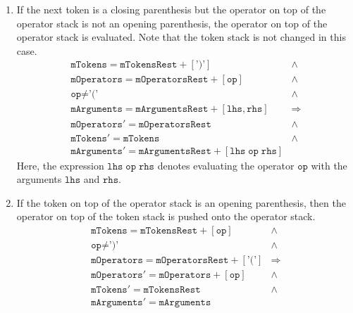 \begin{enumerate}
\item If the next token is a closing parenthesis but the operator on top of the operator stack is not an
      opening parenthesis,  the operator on top of the operator stack is evaluated.  Note that the token stack
      is not changed in this case. 
    $$\begin{array}{lc}
        \texttt{mTokens} = \texttt{mTokensRest} + [\texttt{')'} ] & \wedge \\
        \texttt{mOperators} = \texttt{mOperatorsRest} + [\texttt{op}] & \wedge \\
        \texttt{op} \not= \texttt{'('} & \wedge \\
        \texttt{mArguments} = \texttt{mArgumentsRest} + [\texttt{lhs}, \texttt{rhs}] & \Rightarrow \\[0.2cm]
        \texttt{mOperators}' = \texttt{mOperatorsRest} & \wedge \\
        \texttt{mTokens}' = \texttt{mTokens} & \wedge \\
        \texttt{mArguments}' = \texttt{mArgumentsRest} + [\texttt{lhs} \;\texttt{op}\; \texttt{rhs}]
        \end{array} 
      $$
      Here, the expression $\texttt{lhs} \;\texttt{op}\; \texttt{rhs}$ denotes evaluating the operator $\texttt{op}$ with the arguments
      $\texttt{lhs}$ and $\texttt{rhs}$.
\item If the token on top of the operator stack is an opening parenthesis, then the operator on top of the token stack
      is pushed onto the operator stack.
    $$\begin{array}{lc}
        \texttt{mTokens} = \texttt{mTokensRest} + [\texttt{op}] & \wedge \\
        \texttt{op} \not= \texttt{')'}                          & \wedge \\
        \mathtt{mOperators} = \texttt{mOperatorsRest} + [\texttt{'('}] & \Rightarrow \\[0.2cm]
        \texttt{mOperators}' = \texttt{mOperators} + [\texttt{op}] & \wedge \\
        \texttt{mTokens}' = \texttt{mTokensRest} & \wedge \\
        \texttt{mArguments}' = \texttt{mArguments}
        \end{array} 
      $$
   

\end{enumerate}
